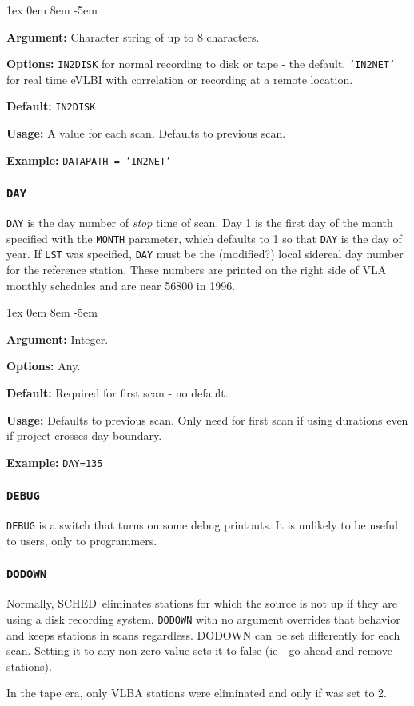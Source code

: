 \documentclass{report}
\newcommand{\schedb}{{\sc SCHED~}}
\newcommand{\rcwbox}[5]{
  \begin{list}{}{\parsep 1ex  \itemsep 0em
                 \leftmargin 8em  \itemindent -5em }
    \item {\bf Argument:} #1
    \item {\bf Options:}  #2
    \item {\bf Default:}  #3
    \item {\bf Usage:}    #4
    \item {\bf Example:}  #5
  \end{list}
}
\begin{document}
\rcwbox
{ Character string of up to 8 characters.}
{  {\tt IN2DISK} for normal recording to disk or tape - the default.
{\tt 'IN2NET'} for real time eVLBI with correlation or recording
at a remote location.}
{{\tt IN2DISK}}
{A value for each scan.  Defaults to previous scan.}
{{\tt DATAPATH = 'IN2NET' }}


\subsubsection{\label{MP:DAY}{\tt DAY}}

{\tt DAY} is the day number of {\em stop} time of scan. Day 1
is the first day of the month specified with the {\tt MONTH}
parameter, which defaults to 1 so that {\tt DAY} is the day of
year. If {\tt LST} was specified, {\tt DAY} must be the (modified?)
local sidereal day number for the reference station. These numbers are
printed on the right side of VLA monthly schedules and are near 56800
in 1996.

\rcwbox
{Integer.}
{Any.}
{Required for first scan - no default.}
{Defaults to previous scan. Only need for first scan if using
durations even if project crosses day boundary.}
{{\tt DAY=135}}


\subsubsection{\label{MP:DEBUG}{\tt DEBUG}}

{\tt DEBUG} is a switch that turns on some debug printouts.  It is
unlikely to be useful to users, only to programmers.


\subsubsection{\label{MP:DODOWN}{\tt DODOWN}}

Normally, \schedb eliminates stations for which the source is not up
if they are using a disk recording system.  {\tt DODOWN} with no
argument overrides that behavior and keeps stations in scans
regardless.  DODOWN can be set differently for each scan.  Setting
it to any non-zero value sets it to false (ie - go ahead and remove
stations).

In the tape era, only VLBA stations were eliminated and only if
 was set to 2.
\end{document}
